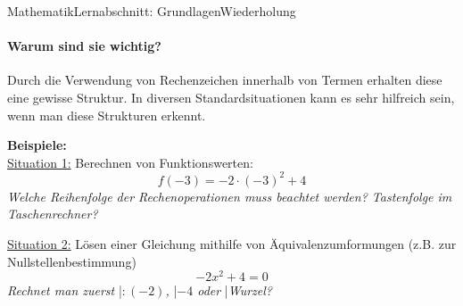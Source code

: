 \documentclass[11pt,twocolumn,oneside,openany,headings=optiontotoc,11pt,numbers=noenddot]{article}
\begin{document}
\begin{worksheet}{Mathematik}{Lernabschnitt: Grundlagen}{Wiederholung}
		\paragraph{Warum sind sie wichtig?}
		Durch die Verwendung von Rechenzeichen innerhalb von Termen erhalten diese eine gewisse Struktur. In diversen Standardsituationen kann es sehr hilfreich sein, wenn man diese Strukturen erkennt.
		\begin{framed}
			\noindent
			\textbf{Beispiele:}\\
			\underline{Situation 1:} Berechnen von Funktionswerten:
			\[f(-3) = -2\cdot (-3)^2 + 4\]
			\textit{Welche Reihenfolge der Rechenoperationen muss beachtet werden? Tastenfolge im Taschenrechner?}\\
			\par\noindent
			\underline{Situation 2:} Lösen einer Gleichung mithilfe von Äquivalenzumformungen (z.B. zur Nullstellenbestimmung)
			\[-2x^2 +4 = 0\]
			\textit{Rechnet man zuerst }|\textit{\(:(-2)\), }|\textit{\(-4\) oder }|\textit{\glqq{}Wurzel\grqq{}?}
		\end{framed}

\end{worksheet}
\end{document}
